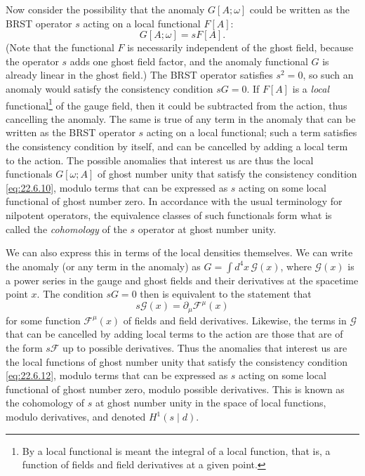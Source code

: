 Now consider the possibility that the anomaly $G[A;\omega]$ could be
written as the BRST operator $s$ acting on a local functional $F[A]$:
\begin{equation}
 G[A;\omega]=sF[A].
 \tag{22.6.11}\label{eq:22.6.11}
\end{equation}
(Note that the functional $F$ is necessarily independent of the ghost
field, because the operator $s$ adds one ghost field factor, and the
anomaly functional $G$ is already linear in the ghost field.) The BRST
operator satisfies $s^2=0$, so such an anomaly would satisfy the
consistency condition $sG=0$. If $F[A]$ is a \emph{local}
functional\footnote{By a local functional is meant the integral of a local
function, that is, a function of fields and field derivatives at a given
point.} of the gauge field, then it could be subtracted from the action,
thus cancelling the anomaly. The same is true of any term in the anomaly
that can be written as the BRST operator $s$ acting on a local functional;
such a term satisfies the consistency condition by itself, and can be
cancelled by adding a local term to the action. The possible anomalies
that interest us are thus the local functionals $G[\omega;A]$ of ghost
number unity that satisfy the consistency condition \eqref{eq:22.6.10},
modulo terms that can be expressed as $s$ acting on some local functional
of ghost number zero. In accordance with the usual terminology for
nilpotent operators, the equivalence classes of such functionals form what
is called the \emph{cohomology} of the $s$ operator at ghost number unity.

We can also express this in terms of the local densities themselves. We
can write the anomaly (or any term in the anomaly) as
$G=\int d^4x\,\mathcal G(x)$, where $\mathcal G(x)$ is a power series in
the gauge and ghost fields and their derivatives at the spacetime point
$x$. The condition $sG=0$ then is equivalent to the statement that
\begin{equation}
 s\mathcal G(x)=\partial_\mu\mathcal F^\mu(x)
 \tag{22.6.12}\label{eq:22.6.12}
\end{equation}
for some function $\mathcal F^\mu(x)$ of fields and field derivatives.
Likewise, the terms in $\mathcal G$ that can be cancelled by adding local
terms to the action are those that are of the form $s\mathcal F$ up to
possible derivatives. Thus the anomalies that interest us are the local
functions of ghost number unity that satisfy the consistency condition
\eqref{eq:22.6.12}, modulo terms that can be expressed as $s$ acting on
some local functional of ghost number zero, modulo possible derivatives.
This is known as the cohomology of $s$ at ghost number unity in the space
of local functions, modulo derivatives, and denoted $H^1(s\mathbin{|}d)$.


